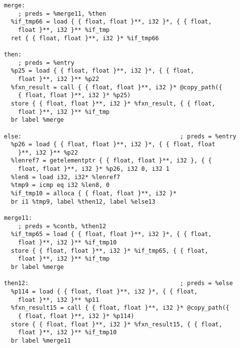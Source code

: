 \documentclass[main.tex]{subfiles}
\begin{document}
{\begin{lstlisting}
merge:                                            
    ; preds = %merge11, %then
  %if_tmp66 = load { { float, float }**, i32 }*, { { float, 
    float }**, i32 }** %if_tmp
  ret { { float, float }**, i32 }* %if_tmp66

then:                                             
    ; preds = %entry
  %p25 = load { { float, float }**, i32 }*, { { float, 
    float }**, i32 }** %p22
  %fxn_result = call { { float, float }**, i32 }* @copy_path({ 
    { float, float }**, i32 }* %p25)
  store { { float, float }**, i32 }* %fxn_result, { { float, 
    float }**, i32 }** %if_tmp
  br label %merge

else:                                             ; preds = %entry
  %p26 = load { { float, float }**, i32 }*, { { float, float 
    }**, i32 }** %p22
  %lenref7 = getelementptr { { float, float }**, i32 }, { { 
    float, float }**, i32 }* %p26, i32 0, i32 1
  %len8 = load i32, i32* %lenref7
  %tmp9 = icmp eq i32 %len8, 0
  %if_tmp10 = alloca { { float, float }**, i32 }*
  br i1 %tmp9, label %then12, label %else13

merge11:                                          
    ; preds = %contb, %then12
  %if_tmp65 = load { { float, float }**, i32 }*, { { float,
    float }**, i32 }** %if_tmp10
  store { { float, float }**, i32 }* %if_tmp65, { { float,
    float }**, i32 }** %if_tmp
  br label %merge

then12:                                           ; preds = %else
  %p114 = load { { float, float }**, i32 }*, { { float, 
    float }**, i32 }** %p11
  %fxn_result15 = call { { float, float }**, i32 }* @copy_path({
    { float, float }**, i32 }* %p114)
  store { { float, float }**, i32 }* %fxn_result15, { { float,
    float }**, i32 }** %if_tmp10
  br label %merge11


\end{lstlisting}}
\end{document}
